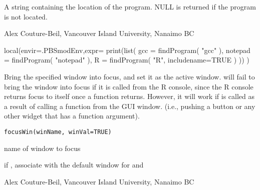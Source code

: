 \documentclass[letterpaper]{book}
\begin{document}
%
\begin{Value}
A string containing the location of the program. NULL is returned if the program is not located.
\end{Value}
%
\begin{Author}\relax
Alex Couture-Beil, Vancouver Island University, Nanaimo BC
\end{Author}
%
\begin{SeeAlso}\relax
{}
\end{SeeAlso}
%
\begin{Examples}
\begin{ExampleCode}
local(envir=.PBSmodEnv,expr={
  print(list(
  gcc =     findProgram( "gcc" ),
  notepad = findProgram( "notepad" ),
  R       = findProgram( "R", includename=TRUE ) ))
})
\end{ExampleCode}
\end{Examples}
%
\begin{Description}\relax
Bring the specified window into focus, and set it as the active window. 
 will fail to bring the window into focus if it is called from the R 
console, since the R console returns focus to itself once a function returns. 
However, it will work if  is called as a result of calling a function 
from the GUI window. (i.e., pushing a button or any other widget that has a 
function argument).
\end{Description}
%
\begin{Usage}
\begin{verbatim}
focusWin(winName, winVal=TRUE)
\end{verbatim}
\end{Usage}
%
\begin{Arguments}
\begin{ldescription}
\item[\code{winName}] name of window to focus
\item[\code{winVal}] if , associate  with the default window 
for  and 
\end{ldescription}
\end{Arguments}
%
\begin{Author}\relax
Alex Couture-Beil, Vancouver Island University, Nanaimo BC
\end{Author}
%
\end{document}
